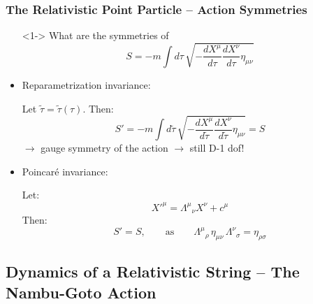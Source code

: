 \documentclass[aspectratio=169]{beamer}
\begin{document}
	\begin{frame}
		\frametitle{The Relativistic Point Particle -- Action Symmetries}
		\begin{itemize}
			\item[]<1-> What are the symmetries of
			\begin{equation*}
				S = -m \int d\tau \, \sqrt{-\frac{dX^\mu}{d\tau} \frac{dX^\nu}{d\tau}\eta_{\mu\nu}}
			\end{equation*}
			\item<2-> Reparametrization invariance:
			\begin{flushleft}
				Let $\tilde{\tau} = \tilde{\tau}(\tau)$. Then:
				\begin{equation*}
					S' = -m \int d\tilde{\tau} \, \sqrt{-\frac{dX^\mu}{d\tilde{\tau}}\frac{dX^\nu}{d\tilde{\tau}}\eta_{\mu\nu}} = S
				\end{equation*}
				$\rightarrow$ gauge symmetry of the action $\rightarrow$ still D-1 dof!
			\end{flushleft}
			\item<2-> Poincaré invariance:
			\begin{flushleft}
				Let:
				\begin{equation*}
					X'^\mu = \Lambda^\mu{}_\nu X^\nu + c^\mu
				\end{equation*}
				Then:
				\begin{equation*}
					S'=S, \qquad \text{as} \qquad \Lambda^\mu{}_\rho \, \eta_{\mu\nu} \, \Lambda^\nu{}_\sigma = \eta_{\rho\sigma}
				\end{equation*}
			\end{flushleft}
		\end{itemize}
	\end{frame}

	\subsection{Dynamics of a Relativistic String -- The Nambu-Goto Action}
\end{document}
